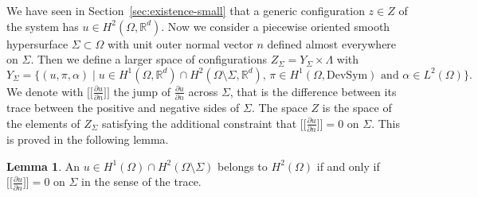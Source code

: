\documentclass[a4paper,10pt,twoside]{amsbook}
\numberwithin{section}{chapter}
\numberwithin{equation}{chapter}
\theoremstyle{definition}
\newtheorem{lemma}[prop]{Lemma}
\newcommand{\dind}[2]{\frac{\partial #1}{\partial #2}}
\begin{document}
We have seen in Section~\ref{sec:existence-small} that a generic configuration $z\in Z$ of the system has $u\in H^2(\Omega,\mathbb{R}^d)$. Now we consider a piecewise oriented smooth hypersurface $\Sigma\subset\Omega$ with unit outer normal vector $n$ defined almost everywhere on $\Sigma$. Then we define a larger space of configurations $Z_\Sigma=Y_\Sigma\times\Lambda$ with
\[
Y_\Sigma=\{(u,\pi,\alpha)\;|\;\text{$u\in H^1(\Omega,\mathbb{R}^d)\cap H^2(\Omega\setminus\Sigma,\mathbb{R}^d)$, $\pi\in H^1(\Omega,\text{DevSym})$ and $\alpha\in L^2(\Omega)$}\}.
\]
We denote with $\big[\!\!\big[\dind{u}{n}\big]\!\!\big]$ the jump of $\dind{u}{n}$ across $\Sigma$, that is the difference between its trace between the positive and negative sides of $\Sigma$. The space $Z$ is the space of the elements of $Z_\Sigma$ satisfying the additional constraint that $\big[\!\!\big[\dind{u}{n}\big]\!\!\big]=0$ on $\Sigma$. This is proved in the following lemma.
\begin{lemma}
An $u\in H^1(\Omega)\cap H^2(\Omega\setminus\Sigma)$ belongs to $H^2(\Omega)$ if and only if $\big[\!\!\big[\dind{u}{n}\big]\!\!\big]=0$ on $\Sigma$ in the sense of the trace.
\end{lemma}
\end{document}
